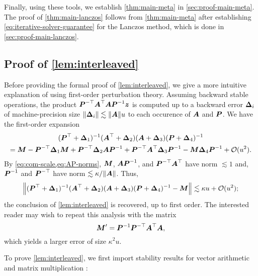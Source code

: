 \documentclass[onefignum,onetabnum,pagebackref,dvipsnames]{siamart220329}
\begin{document}
Finally, using these tools, we establish \cref{thm:main-meta} in \cref{sec:proof-main-meta}.
The proof of \cref{thm:main-lanczos} follows from \cref{thm:main-meta} after establishing \cref{eq:iterative-solver-guarantee} for the Lanczos method, which is done in \cref{sec:proof-main-lanczos}.

\subsection{Proof of \cref{lem:interleaved}} \label{sec:proof-interleaved}

Before providing the formal proof of \cref{lem:interleaved}, we give a more intuitive explanation of using first-order perturbation theory.
Assuming backward stable operations, the product $\boldsymbol{P}^{-\top}\boldsymbol{A}^\top\boldsymbol{A}\boldsymbol{P}^{-1}\boldsymbol{z}$ is computed up to a backward error $\boldsymbol{\Delta}_i$ of machine-precision size $\norm{\mat{\Delta}_i} \lesssim \norm{\mat{A}}u$ to each occurence of $\boldsymbol{A}$ and $\boldsymbol{P}$.
We have the first-order expansion
%
\begin{multline*}
    (\boldsymbol{P}^\top + \boldsymbol{\Delta}_1)^{-1}(\boldsymbol{A}^\top + \boldsymbol{\Delta}_2)(\boldsymbol{A} + \boldsymbol{\Delta}_3)(\boldsymbol{P} + \boldsymbol{\Delta}_4)^{-1} \\ = \boldsymbol{M} - \boldsymbol{P}^{-\top} \boldsymbol{\Delta}_1 \boldsymbol{M} + \boldsymbol{P}^{-\top} \boldsymbol{\Delta}_2 \boldsymbol{A}\boldsymbol{P}^{-1} + \boldsymbol{P}^{-\top} \boldsymbol{A}^\top \boldsymbol{\Delta}_3 \boldsymbol{P}^{-1} - \boldsymbol{M}\boldsymbol{\Delta}_4\boldsymbol{P}^{-1} + \mathcal{O}(u^2).
\end{multline*}
%
By \cref{eq:com-scale,eq:AP-norms}, $\boldsymbol{M}$, $\boldsymbol{A}\boldsymbol{P}^{-1}$, and $\boldsymbol{P}^{-\top}\boldsymbol{A}^\top$ have norm $\lesssim 1$ and, $\boldsymbol{P}^{-1}$ and $\boldsymbol{P}^{-\top}$ have norm $\lesssim \kappa / \norm{\mat{A}}$.
Thus,
%
\begin{equation*}
    \norm{(\mat{P}^\top + \mat{\Delta}_1)^{-1}(\mat{A}^\top + \mat{\Delta}_2)(\mat{A} + \mat{\Delta}_3)(\mat{P} + \mat{\Delta}_4)^{-1} - \mat{M}} \lesssim \kappa u + \order(u^2);
\end{equation*}
%
the conclusion of \cref{lem:interleaved} is recovered, up to first order.
The interested reader may wish to repeat this analysis with the matrix
%
\begin{equation*}
    \boldsymbol{M}' = \boldsymbol{P}^{-1}\boldsymbol{P}^{-\top}\boldsymbol{A}^\top\boldsymbol{A},
\end{equation*}
%
which yields a larger error of size $\kappa^2 u$.

To prove \cref{lem:interleaved}, we first import stability results for vector arithmetic and matrix multiplication \cite[secs.~2--3]{Hig02}: 
\end{document}
